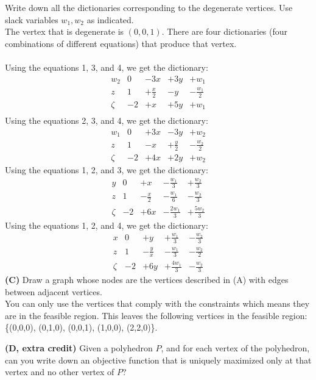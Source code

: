 \documentclass[11pt]{article}
\begin{document}
Write down all the dictionaries corresponding to the degenerate
vertices. Use slack variables $w_1, w_2$ as indicated.
\\
The vertex that is degenerate is $(0,0,1)$. There are four dictionaries (four combinations of different equations) that produce that vertex.\\
\\
Using the equations 1, 3, and 4, we get the dictionary:
\[\begin{array}{r|ccccc}
w_2 & 0 & -3x & +3y & +w_1 \\
z & 1 & +\frac{x}{2} & -y & -\frac{w_1}{2} \\
\hline
\zeta & -2 & +x & +5y & +w_1 \\
\end{array}\]
Using the equations 2, 3, and 4, we get the dictionary:
\[\begin{array}{r|ccccc}
w_1 & 0 & +3x & -3y & +w_2 \\
z & 1 & -x & +\frac{y}{2} & -\frac{w_2}{2} \\
\hline
\zeta & -2 & +4x & +2y & +w_2
\end{array}\]
Using the equations 1, 2, and 3, we get the dictionary:
\[\begin{array}{r|ccccc}
y & 0 & +x & -\frac{w_1}{3} & +\frac{w_2}{3} \\
z & 1 & -\frac{x}{2} & -\frac{w_1}{6} & -\frac{w_2}{3} \\
\hline
\zeta & -2 & +6x & -\frac{2w_1}{3} & +\frac{5w_2}{3}
\end{array}\]
Using the equations 1, 2, and 4, we get the dictionary:
\[\begin{array}{r|ccccc}
x & 0 & +y & +\frac{w_1}{3} & -\frac{w_2}{3} \\
z & 1 & -\frac{y}{x} & -\frac{w_1}{3} & -\frac{w_2}{2} \\
\hline
\zeta & -2 & +6y & +\frac{4w_1}{3} & -\frac{w_2}{3}
\end{array}\]
\noindent\textbf{(C)} Draw a graph whose nodes are the vertices
described in (A) with edges between adjacent vertices. 
\\
You can only use the vertices that comply with the constraints which means they are in the feasible region.  This leaves the following vertices in the feasible region: \{(0,0,0), (0,1,0), (0,0,1), (1,0,0), (2,2,0)\}.


\medskip

\noindent\textbf{(D, extra credit)} Given a polyhedron $P$, and for
each vertex of the polyhedron,  can you  write down an
objective function that is uniquely maximized only at that vertex and
no other vertex of $P$? 
\end{document}

